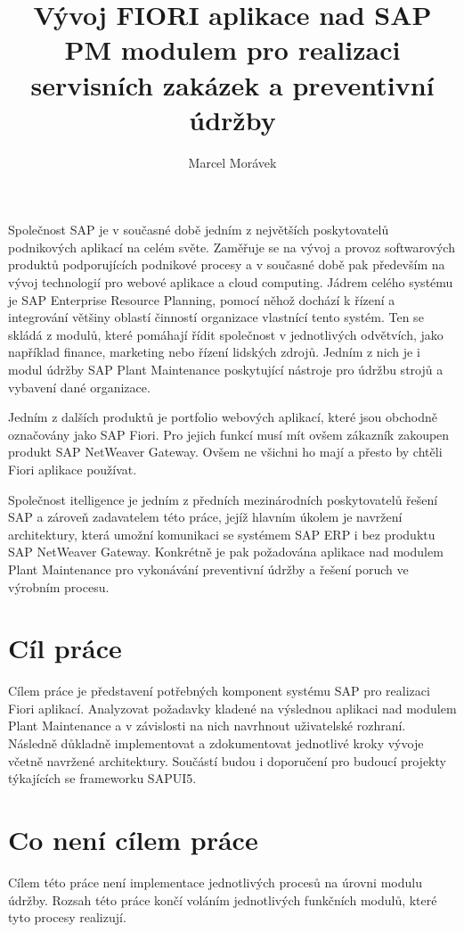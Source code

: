 \documentclass[thesis=M,czech]{FITthesis}[2012/06/26]
\title{Vývoj FIORI aplikace nad SAP PM modulem pro realizaci servisních zakázek a preventivní údržby}
\author{Marcel Morávek} %
\begin{document}

\begin{introduction}
Společnost SAP je v současné době jedním z největších poskytovatelů podnikových aplikací na celém světe. Zaměřuje se na vývoj a provoz softwarových produktů podporujících podnikové procesy a v současné době pak především na vývoj technologií pro webové aplikace a cloud computing. Jádrem celého systému je SAP Enterprise Resource Planning, pomocí něhož dochází k řízení a integrování většiny oblastí činností organizace vlastnící tento systém. Ten se skládá z modulů, které pomáhají řídit společnost v jednotlivých odvětvích, jako například finance, marketing nebo řízení lidských zdrojů. Jedním z nich je i modul údržby SAP Plant Maintenance poskytující nástroje pro údržbu strojů a vybavení dané organizace. 

Jedním z dalších produktů je portfolio webových aplikací, které jsou obchodně označovány jako SAP Fiori. Pro jejich funkcí musí mít ovšem zákazník zakoupen produkt SAP NetWeaver Gateway. Ovšem  ne všichni ho mají a přesto by chtěli Fiori aplikace používat.

Společnost itelligence je jedním z předních mezinárodních poskytovatelů řešení SAP a zároveň zadavatelem této práce, jejíž hlavním úkolem je navržení architektury, která umožní komunikaci se systémem SAP ERP i bez produktu SAP NetWeaver Gateway. Konkrétně je pak požadována aplikace nad modulem Plant Maintenance pro vykonávání preventivní údržby a řešení poruch ve výrobním procesu. 

\section{Cíl práce}
Cílem práce je představení potřebných komponent systému SAP pro realizaci Fiori aplikací. Analyzovat požadavky kladené na výslednou aplikaci nad modulem Plant Maintenance a v závislosti na nich navrhnout uživatelské rozhraní. Následně důkladně implementovat a zdokumentovat jednotlivé kroky vývoje včetně navržené architektury. Součástí budou i doporučení pro budoucí projekty týkajících se frameworku SAPUI5.

\section{Co není cílem práce}
Cílem této práce není implementace jednotlivých procesů na úrovni modulu údržby. Rozsah této práce končí voláním jednotlivých funkčních modulů, které tyto procesy realizují. 


\end{introduction}
\end{document}
